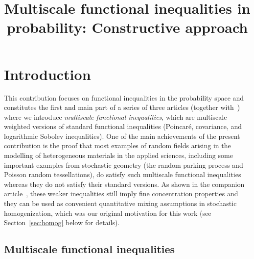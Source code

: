 \documentclass[AHL,Unicode,longabstracts]{cedram}
\title[Multiscale functional inequalities: Constructive approach]{Multiscale functional inequalities in probability: Constructive approach}
\author{\firstname{Mitia} \lastname{Duerinckx}}
\author{\firstname{Antoine} \lastname{Gloria}}
\begin{document}
\maketitle

\section{Introduction}

This contribution focuses on functional inequalities in the probability space and constitutes the first and main part of a series of three articles (together with~\cite{DG1,DG3}) where we introduce \emph{multiscale functional inequalities}, which are multiscale weighted versions of standard functional inequalities (Poincaré, covariance, and logarithmic Sobolev inequalities). One of the main achievements of the present contribution is the proof that most examples of random fields arising in the modelling of heterogeneous materials in the applied sciences, including some important examples from stochastic geometry (the random parking process and Poisson random tessellations), do satisfy such multiscale functional inequalities whereas they do not satisfy their standard versions. As shown in the companion article~\cite{DG1}, these weaker inequalities still imply fine concentration properties and they can be used as convenient quantitative mixing assumptions in stochastic homogenization, which was our original motivation for this work (see Section~\ref{sec:homog} below for details).



\subsection{Multiscale functional inequalities}
\end{document}
